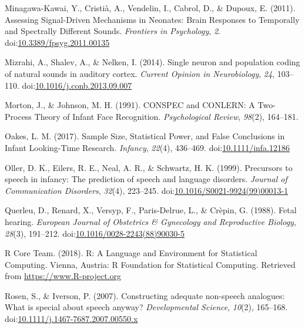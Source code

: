 \documentclass[man,floatsintext]{apa6}
\begin{document}
\hypertarget{ref-minagawa-kawai_assessing_2011}{}
Minagawa-Kawai, Y., Cristià, A., Vendelin, I., Cabrol, D., \& Dupoux, E.
(2011). Assessing Signal-Driven Mechanisms in Neonates: Brain Responses
to Temporally and Spectrally Different Sounds. \emph{Frontiers in
Psychology}, \emph{2}.
doi:\href{https://doi.org/10.3389/fpsyg.2011.00135}{10.3389/fpsyg.2011.00135}

\hypertarget{ref-mizrahi_single_2014}{}
Mizrahi, A., Shalev, A., \& Nelken, I. (2014). Single neuron and
population coding of natural sounds in auditory cortex. \emph{Current
Opinion in Neurobiology}, \emph{24}, 103--110.
doi:\href{https://doi.org/10.1016/j.conb.2013.09.007}{10.1016/j.conb.2013.09.007}

\hypertarget{ref-morton_conspec_1991}{}
Morton, J., \& Johnson, M. H. (1991). CONSPEC and CONLERN: A Two-Process
Theory of Infant Face Recognition. \emph{Psychological Review},
\emph{98}(2), 164--181.

\hypertarget{ref-oakes_sample_2017}{}
Oakes, L. M. (2017). Sample Size, Statistical Power, and False
Conclusions in Infant Looking-Time Research. \emph{Infancy},
\emph{22}(4), 436--469.
doi:\href{https://doi.org/10.1111/infa.12186}{10.1111/infa.12186}

\hypertarget{ref-oller_precursors_1999}{}
Oller, D. K., Eilers, R. E., Neal, A. R., \& Schwartz, H. K. (1999).
Precursors to speech in infancy: The prediction of speech and language
disorders. \emph{Journal of Communication Disorders}, \emph{32}(4),
223--245.
doi:\href{https://doi.org/10.1016/S0021-9924(99)00013-1}{10.1016/S0021-9924(99)00013-1}

\hypertarget{ref-querleu_fetal_1988}{}
Querleu, D., Renard, X., Versyp, F., Paris-Delrue, L., \& Crèpin, G.
(1988). Fetal hearing. \emph{European Journal of Obstetrics \&
Gynecology and Reproductive Biology}, \emph{28}(3), 191--212.
doi:\href{https://doi.org/10.1016/0028-2243(88)90030-5}{10.1016/0028-2243(88)90030-5}

\hypertarget{ref-r_core_team_r:_2018}{}
R Core Team. (2018). R: A Language and Environment for Statistical
Computing. Vienna, Austria: R Foundation for Statistical Computing.
Retrieved from \url{https://www.R-project.org}

\hypertarget{ref-rosen_constructing_2007}{}
Rosen, S., \& Iverson, P. (2007). Constructing adequate non-speech
analogues: What is special about speech anyway? \emph{Developmental
Science}, \emph{10}(2), 165--168.
doi:\href{https://doi.org/10.1111/j.1467-7687.2007.00550.x}{10.1111/j.1467-7687.2007.00550.x}
\end{document}
